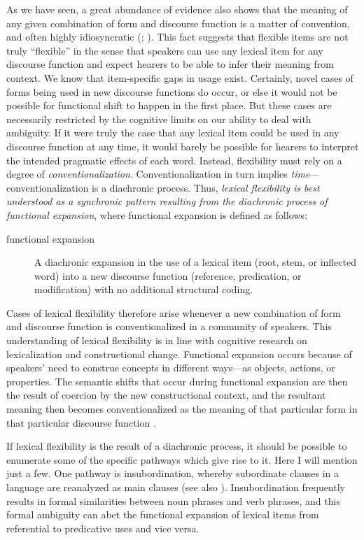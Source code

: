 As we have seen, a great abundance of evidence also shows that the meaning of any given combination of form and discourse function is a matter of convention, and often highly idiosyncratic (; ). This fact suggests that flexible items are not truly \enquote{flexible} in the sense that speakers can use any lexical item for any discourse function and expect hearers to be able to infer their meaning from context. We know that item-specific gaps in usage exist. Certainly, novel cases of forms being used in new discourse functions do occur, or else it would not be possible for functional shift to happen in the first place. But these cases are necessarily restricted by the cognitive limits on our ability to deal with ambiguity. If it were truly the case that any lexical item could be used in any discourse function at any time, it would barely be possible for hearers to interpret the intended pragmatic effects of each word. Instead, flexibility must rely on a degree of \emph{conventionalization}. Conventionalization in turn implies \emph{time}—conventionalization is a diachronic process. Thus, \emph{lexical flexibility is best understood as a synchronic pattern resulting from the diachronic process of functional expansion}, where functional expansion is defined as follows:

\begin{description}
  \item[functional expansion] A diachronic expansion in the use of a lexical item (root, stem, or inflected word) into a new discourse function (reference, predication, or modification) with no additional structural coding.
\end{description}

\noindent Cases of lexical flexibility therefore arise whenever a new combination of form and discourse function is conventionalized in a community of speakers. This understanding of lexical flexibility is in line with cognitive research on lexicalization and constructional change. Functional expansion occurs because of speakers' need to construe concepts in different ways—as objects, actions, or properties. The semantic shifts that occur during functional expansion are then the result of coercion by the new constructional context, and the resultant meaning then becomes conventionalized as the meaning of that particular form in that particular discourse function \parencite[108]{Croft1991}.

If lexical flexibility is the result of a diachronic process, it should be possible to enumerate some of the specific pathways which give rise to it. Here I will mention just a few. One pathway is insubordination, whereby subordinate clauses in a language are reanalyzed as main clauses \parencites{Evans2007}{Mithun2008}{EvansWatanabe2016} (see also ). Insubordination frequently results in formal similarities between noun phrases and verb phrases, and this formal ambiguity can abet the functional expansion of lexical items from referential to predicative uses and vice versa.

